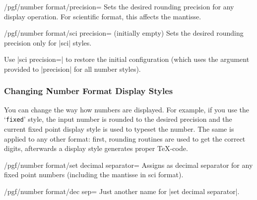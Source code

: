 \begin{key}{/pgf/number format/precision=}
Sets the desired rounding precision for any display operation. For scientific format, this affects the mantisse.
\end{key}
\begin{key}{/pgf/number format/sci precision= (initially empty)}
	Sets the desired rounding precision only for |sci| styles. 

	Use |sci precision={}| to restore the initial configuration (which uses the argument provided to |precision| for all number styles).
\end{key}


\subsubsection{Changing Number Format Display Styles}%
\label{sec:number:styles}%
You can change the way how numbers are displayed. For example, if you use the `\texttt{fixed}' style, the input number is rounded to the desired precision and the current fixed point display style is used to typeset the number. The same is applied to any other format: first, rounding routines are used to get the correct digits, afterwards a display style generates proper \TeX-code.

\begin{key}{/pgf/number format/set decimal separator=}
Assigns  as decimal separator for any fixed point numbers (including the mantisse in sci format).
\end{key}
\begin{key}{/pgf/number format/dec sep=}
	Just another name for |set decimal separator|.
\end{key}



